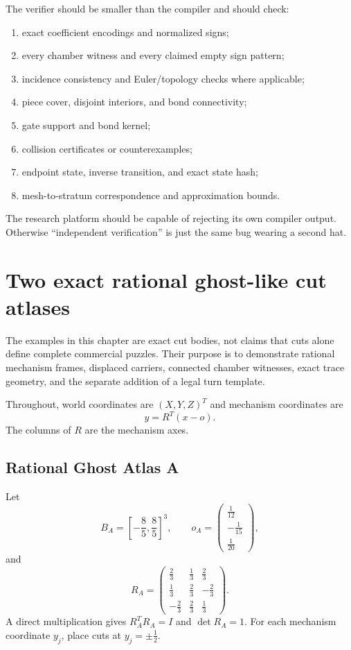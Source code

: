 \documentclass[11pt,openany]{book}
\theoremstyle{polyplain}
\theoremstyle{polydef}
\begin{document}
The verifier should be smaller than the compiler and should check:
\begin{enumerate}
  \item exact coefficient encodings and normalized signs;
  \item every chamber witness and every claimed empty sign pattern;
  \item incidence consistency and Euler/topology checks where applicable;
  \item piece cover, disjoint interiors, and bond connectivity;
  \item gate support and bond kernel;
  \item collision certificates or counterexamples;
  \item endpoint state, inverse transition, and exact state hash;
  \item mesh-to-stratum correspondence and approximation bounds.
\end{enumerate}
The research platform should be capable of rejecting its own compiler output. Otherwise ``independent verification'' is just the same bug wearing a second hat.

\chapter{Two exact rational ghost-like cut atlases}
\label{chap:examples}

The examples in this chapter are exact cut bodies, not claims that cuts alone define complete commercial puzzles. Their purpose is to demonstrate rational mechanism frames, displaced carriers, connected chamber witnesses, exact trace geometry, and the separate addition of a legal turn template.

Throughout, world coordinates are $(X,Y,Z)^T$ and mechanism coordinates are
\[
y=R^T(x-o).
\]
The columns of $R$ are the mechanism axes.

\section{Rational Ghost Atlas A}
\label{sec:rational-ghost-a}

Let
\[
B_A=\left[-\frac85,\frac85\right]^3,
\qquad
o_A=\begin{pmatrix}\frac1{12}\\-\frac1{15}\\\frac1{20}\end{pmatrix},
\]
and
\[
R_A=
\begin{pmatrix}
\frac23&\frac13&\frac23\\
\frac13&\frac23&-\frac23\\
-\frac23&\frac23&\frac13
\end{pmatrix}.
\]
A direct multiplication gives $R_A^TR_A=I$ and $\det R_A=1$. For each mechanism coordinate $y_j$, place cuts at $y_j=\pm\frac12$.
\end{document}

